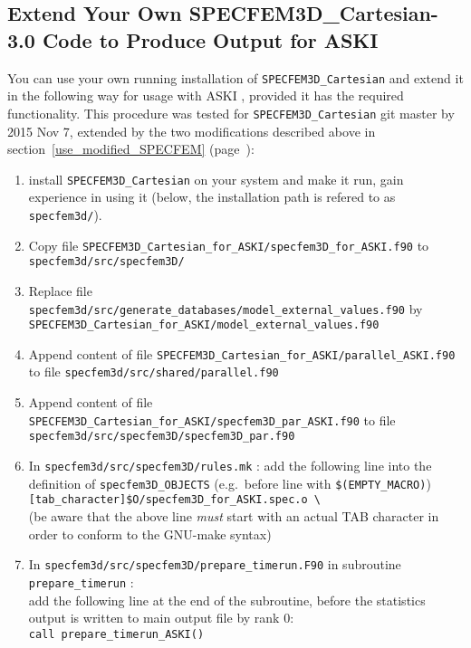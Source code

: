 \documentclass[12pt,a4paper]{article}
\newcommand{\lcode}[1]{\nolinkurl{#1}}
\newcommand{\lcodetitle}[1]{ {\ttfamily #1} }
\newcommand{\ASKI}{ {\ttfamily ASKI} }
\newcommand{\myref}[1]{\ref{#1} (page~\pageref{#1})}
\begin{document}
\subsection{Extend Your Own \lcodetitle{SPECFEM3D\_Cartesian-3.0} Code to Produce Output for \ASKI{}} \label{extent_to_ASKI}
You can use your own running installation of \lcode{SPECFEM3D_Cartesian} and extend it in the following way
for usage with \ASKI{}, provided it has the required functionality. 
This procedure was tested for \lcode{SPECFEM3D_Cartesian} git master by 2015 Nov 7, 
extended by the two modifications described above in section~\myref{use_modified_SPECFEM}{}:
\begin{enumerate}
\item install \lcode{SPECFEM3D_Cartesian} on your system and make it run, gain 
   experience in using it (below, the installation path is refered to as 
   \lcode{specfem3d/}).

\item Copy file \lcode{SPECFEM3D_Cartesian_for_ASKI/specfem3D_for_ASKI.f90} to 
   \lcode{specfem3d/src/specfem3D/}

\item Replace file \lcode{specfem3d/src/generate_databases/model_external_values.f90} by 
   \lcode{SPECFEM3D_Cartesian_for_ASKI/model_external_values.f90}

\item Append content of file \lcode{SPECFEM3D_Cartesian_for_ASKI/parallel_ASKI.f90}
   to file \lcode{specfem3d/src/shared/parallel.f90}

\item Append content of file \lcode{SPECFEM3D_Cartesian_for_ASKI/specfem3D_par_ASKI.f90}
   to file \lcode{specfem3d/src/specfem3D/specfem3D_par.f90}

\item In \lcode{specfem3d/src/specfem3D/rules.mk} : add the following line into the 
   definition of \lcode{specfem3D_OBJECTS} (e.g.\ before line with \lcode{$(EMPTY_MACRO)})\\
\lcode{[tab_character]$O/specfem3D_for_ASKI.spec.o \ }\\
   (be aware that the above line \emph{must} start with an actual TAB character in order 
   to conform to the GNU-make syntax)

\item In \lcode{specfem3d/src/specfem3D/prepare_timerun.F90} in subroutine \lcode{prepare_timerun} :\\
   add the following line at the end of the subroutine, before the statistics 
   output is written to main output file by rank 0:\\
   \lcode{call prepare_timerun_ASKI()}


\end{enumerate}
\end{document}
